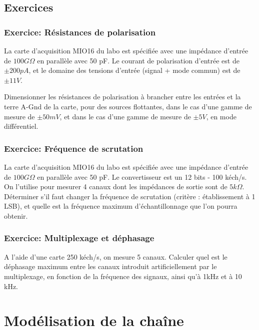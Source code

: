 \section{Exercices}

\subsection{Exercice: Résistances de polarisation}
La carte d'acquisition MIO16 du labo est spécifiée avec une impédance d'entrée de $100G\Omega$ en parallèle avec 50 pF. Le courant de polarisation d'entrée est de $\pm200pA$, et le domaine des tensions d'entrée (signal + mode commun) est de $\pm11V$.

Dimensionner les résistances de polarisation à brancher entre les entrées et la terre A-Gnd de la carte, pour des sources flottantes, dans le cas d'une gamme de mesure de $\pm50mV$, et dans le cas d'une gamme de mesure de $\pm5V$, en mode différentiel.


\subsection{Exercice: Fréquence de scrutation}
La carte d'acquisition MIO16 du labo est spécifiée avec une impédance d'entrée de $100G\Omega$ en parallèle avec 50 pF. Le convertisseur est un 12 bits - 100 kéch/s. On l'utilise pour mesurer 4 canaux dont les impédances de sortie sont de $5k\Omega$. Déterminer s'il faut changer la fréquence de scrutation (critère : établissement à 1 LSB), et quelle est la fréquence maximum d'échantillonnage que l'on pourra obtenir.

\subsection{Exercice: Multiplexage et déphasage}
A l'aide d'une carte 250 kéch/s, on mesure 5 canaux. Calculer quel est le déphasage maximum entre les canaux introduit artificiellement par le multiplexage, en fonction de la fréquence des signaux, ainsi qu'à 1kHz et à 10 kHz.


\chapter{Modélisation de la chaîne}

